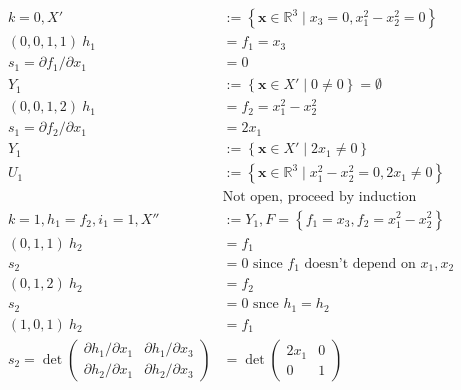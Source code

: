 \documentclass[
]{book}
\theoremstyle{definition}
\theoremstyle{definition}
\theoremstyle{definition}
\theoremstyle{definition}
\theoremstyle{remark}
\begin{document}
\begin{align}
k=0,X'&:=\left\{ \mathbf{x}\in\mathbb{R}^{3}\mid x_{3}=0,x_{1}^{2}-x_{2}^{2}=0\right\} \\\left(0,0,1,1\right)\ h_{1}&=f_{1}=x_{3}\\s_{1}=\partial f_{1}/\partial x_{1}&=0\\Y_{1}&:=\left\{ \mathbf{x}\in X'\mid0\ne0\right\} =\emptyset\\(0,0,1,2)\ h_{1}&=f_{2}=x_{1}^{2}-x_{2}^{2}\\s_{1}=\partial f_{2}/\partial x_{1}&=2x_{1}\\Y_{1}&:=\left\{ \mathbf{x}\in X'\mid2x_1\ne0\right\} \\U_{1}&:=\left\{ \mathbf{x}\in\mathbb{R}^{3}\mid x_{1}^{2}-x_{2}^{2}=0,2x_{1}\ne0\right\} \\&\text{Not open, proceed by induction}\\k=1,h_{1}=f_{2},i_{1}=1,X''&:=Y_{1},F=\left\{ f_{1}=x_{3},f_{2}=x_{1}^{2}-x_{2}^{2}\right\} \\\left(0,1,1\right)\ h_{2}&=f_{1}\\s_{2}&=0\text{ since }f_{1}\text{ doesn't depend on }x_{1},x_{2}\\\left(0,1,2\right)\ h_{2}&=f_{2}\\s_{2}&=0\text{ snce }h_{1}=h_{2}\\\left(1,0,1\right)\ h_{2}&=f_{1}\\s_{2}=\det\begin{pmatrix}\partial h_{1}/\partial x_{1} & \partial h_{1}/\partial x_{3}\\
\partial h_{2}/\partial x_{1} & \partial h_{2}/\partial x_{3}
\end{pmatrix}&=\det\begin{pmatrix}2x_{1} & 0\\
0 & 1

\end{pmatrix}
\end{align}
\end{document}
